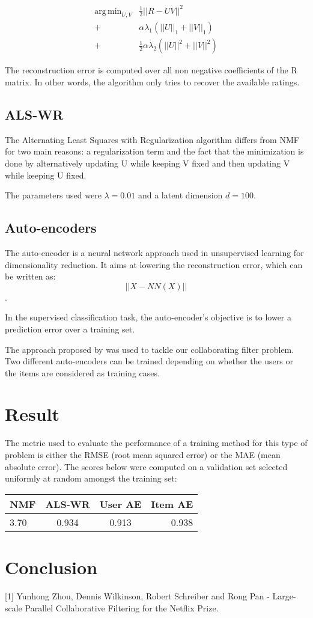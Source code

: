 \documentclass[10pt,twocolumn]{article}
\DeclareMathOperator*{\argmin}{arg\,min}
\begin{document}
\begin{equation*}\begin{split}
\argmin_{U,V} & \frac{1}{2} ||R - UV||^2 \\
			  + & \alpha \lambda_1 (||U||_1 + ||V||_1) \\
			  + & \frac{1}{2} \alpha \lambda_2  (||U||^2 + ||V||^2) 
\end{split}\end{equation*}  

The reconstruction error is computed over all non negative coefficients of the R matrix. In other words, the algorithm only tries to recover the available ratings. 

\subsection{ALS-WR}

The Alternating Least Squares with Regularization algorithm \cite{zhou2008large} differs from NMF for two main reasons: a regularization term and the fact that the minimization is done by alternatively updating U while keeping V fixed and then updating V while keeping U fixed.

The parameters used were $\lambda = 0.01$ and a latent dimension $d = 100$.


\subsection{Auto-encoders}

The auto-encoder is a neural network approach used in unsupervised learning for dimensionality reduction. It aims at lowering the reconstruction error, which can be written as:
$$ || X - NN(X) || $$. 

In the supervised classification task, the auto-encoder's objective is to lower a prediction error over a training set.

The approach proposed by \cite{strub2016hybrid} was used to tackle our collaborating filter problem. Two different auto-encoders can be trained depending on whether the users or the items are considered as training cases. 

\section{Result}
The metric used to evaluate the performance of a training method for this type of problem is either the RMSE (root mean squared error) or the MAE (mean absolute error). The scores below were computed on a validation set selected uniformly at random amongst the training set:
\begin{tabular}{|l|c|c|r}
  \hline
  NMF & ALS-WR & User AE & Item AE \\
  \hline
  3.70 & 0.934 & 0.913 & 0.938 \\
  \hline
\end{tabular}


\section{Conclusion}

[1] Yunhong Zhou, Dennis Wilkinson, Robert Schreiber and Rong Pan - Large-scale Parallel Collaborative Filtering for the Netflix Prize.


\end{document}
